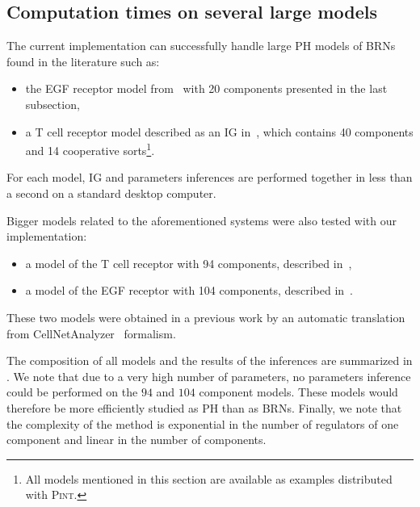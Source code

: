 \subsection{Computation times on several large models}\label{ssec:cpu}

The current implementation can successfully handle large PH models of BRNs found in the literature such as:
\begin{itemize}
  \item the EGF receptor model from~\cite{Sahin09} with 20 components presented in the last subsection,
  \item a T cell receptor model described as an IG in~\cite{Klamt06}, which contains 40 components and 14 cooperative
    sorts\footnote{All models mentioned in this section are available as examples distributed with \textsc{Pint}.}.
\end{itemize}
For each model, IG and parameters inferences are performed together in less than a second
on a standard desktop computer.

Bigger models related to the aforementioned systems were also tested with our implementation:
\begin{itemize}
  \item a model of the T cell receptor with 94 components, described in~\cite{SaezRodriguez2007},
  \item a model of the EGF receptor with 104 components, described in~\cite{Samaga2009}.
\end{itemize}
These two models were obtained in a previous work by an automatic translation from CellNetAnalyzer~\cite{klamt2007structural} formalism.

The composition of all models and the results of the inferences are summarized in .
We note that due to a very high number of parameters, no parameters inference could be performed on the $94$ and $104$ component models.
These models would therefore be more efficiently studied as PH than as BRNs.
Finally, we note that the complexity of the method is exponential in the number of regulators of one
component and linear in the number of components.

